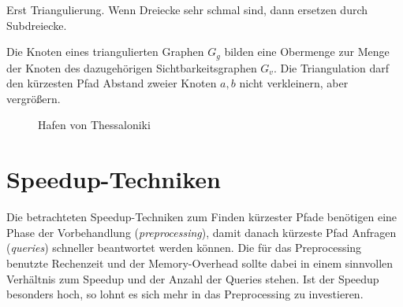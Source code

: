 
Erst Triangulierung. Wenn Dreiecke sehr schmal sind, dann ersetzen durch Subdreiecke.

Die Knoten eines triangulierten Graphen $G_g$ bilden eine Obermenge zur Menge der Knoten des dazugehörigen Sichtbarkeitsgraphen $G_v$.
Die Triangulation darf den kürzesten Pfad Abstand zweier Knoten $a, b$ nicht verkleinern, aber vergrößern.


\begin{figure}[ht]%
    \centering
    \caption{Hafen von Thessaloniki}%
    \label{fig:thessaloniki_comparison}%
\end{figure}

\section{Speedup-Techniken}

Die betrachteten Speedup-Techniken zum Finden kürzester Pfade benötigen eine Phase der Vorbehandlung (\emph{preprocessing}), damit danach kürzeste Pfad Anfragen (\emph{queries}) schneller beantwortet werden können.
Die für das Preprocessing benutzte Rechenzeit und der Memory-Overhead sollte dabei in einem sinnvollen Verhältnis zum Speedup und der Anzahl der Queries stehen.
Ist der Speedup besonders hoch, so lohnt es sich mehr in das Preprocessing zu investieren.

